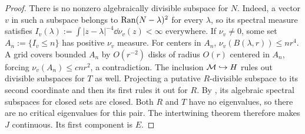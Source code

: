 \begin{proof}
There is no nonzero algebraically divisible subspace for $N$.
Indeed, a vector $v$ in such a subspace belongs to $\operatorname{Ran}(N-\lambda)^2$ for every $\lambda$, so its spectral measure satisfies $I_v(\lambda):=\int|z-\lambda|^{-4}\dd\nu_v(z)<\infty$ everywhere.
If $\nu_v\ne0$, some set $A_n:=\{I_v\le n\}$ has positive $\nu_v$ measure.
For centers in $A_n$, $\nu_v(B(\lambda,r))\le nr^4$.
A grid covers bounded $A_n$ by $O(r^{-2})$ disks of radius $O(r)$ centered in $A_n$, forcing $\nu_v(A_n)\le cnr^2$, a contradiction.
The inclusion $\mathcal M\hookrightarrow H$ rules out divisible subspaces for $T$ as well.
Projecting a putative $R$-divisible subspace to its second coordinate and then its first rules it out for $R$.
By \cite[Proposition~3.7]{Lau88}, its algebraic spectral subspaces for closed sets are closed.
Both $R$ and $T$ have no eigenvalues, so there are no critical eigenvalues for this pair.
The intertwining theorem \cite[Theorem~4.1]{Lau88} therefore makes $J$ continuous.
Its first component is $E$.
\end{proof}

